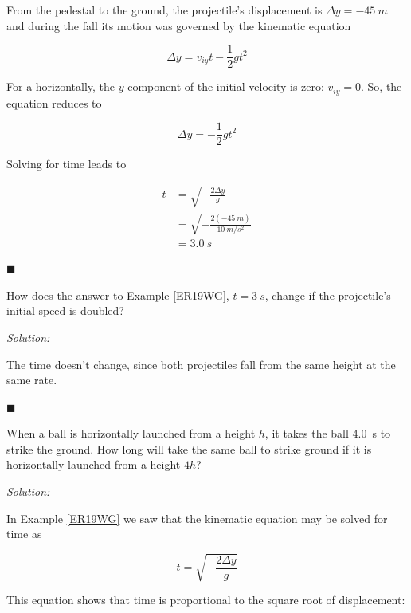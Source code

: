 \documentclass[dvipsnames]{article}
\begin{document}
From the pedestal to the ground, the projectile's displacement is $\Delta y = \SI{-45}{m}$ and during the fall its motion was governed by the kinematic equation

\begin{equation*}
    \Delta y = v_{iy} t - \frac{1}{2} g t^2
\end{equation*}

For a horizontally, the $y$-component of the initial velocity is zero: $v_{iy} = 0$. So, the equation reduces to

\begin{equation*}
    \Delta y = -\frac{1}{2}gt^2
\end{equation*}

Solving for time leads to

\begin{align*}
    t &= \sqrt{-\frac{2\Delta y}{g}} \\[1ex]
    &= \sqrt{-\frac{2(-\SI{45}{m})}{\SI{10}{m/s^2}}} \\[1ex]
    &= \boxed{\SI{3.0}{s}}
\end{align*}

\hfill $\blacksquare$

\begin{example} \label{ADuHT8}
    How does the answer to Example \ref{ER19WG}, $t=\SI{3}{s}$, change if the projectile's initial speed is doubled?
\end{example}

\textit{Solution:}

The time doesn't change, since both projectiles fall from the same height at the same rate.

\hfill $\blacksquare$

\begin{example} \label{mT7mjd}
    When a ball is horizontally launched from a height $h$, it takes the ball \SI{4.0}{s} to strike the ground. How long will take the same ball to strike ground if it is horizontally launched from a height $4h$?
\end{example}

\textit{Solution:}

In Example \ref{ER19WG} we saw that the kinematic equation may be solved for time as

\begin{equation*}
    t = \sqrt{-\frac{2\Delta y}{g}}
\end{equation*}

This equation shows that time is proportional to the square root of displacement:
\end{document}
